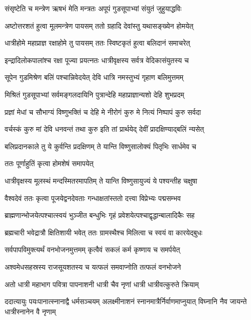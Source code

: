 \twolineshloka
{संसृष्टेति च मन्त्रेण ऋषभं मेति मन्त्रतः}
{अपूपं गुडसूपाभ्यां संयुतं जुहुयाद्धविः} %

\twolineshloka
{अष्टोत्तरशतं हुत्वा मूलमन्त्रेण पायसम्}
{ततो ग्रहादि देवांस्तु यथासङ्ख्येन होमयेत्} %

\twolineshloka
{धात्रीहोमे महाप्राज्ञ रक्षाहोमे तु पायसम्}
{ततः स्विष्टकृतं हुत्वा बलिदानं समाचरेत्} %

\twolineshloka
{इन्द्रादिलोकपालांश्च रक्षा पूज्या प्रयत्नतः}
{धात्रीवृक्षस्य सर्वत्र वेदिकासंयुतस्य च} %

\twolineshloka
{सूपेन गुडमिश्रेण बलिं पश्चान्निवेदयेत्}
{देवि धात्रि नमस्तुभ्यं गृहाण बलिमुत्तमम्} %

\twolineshloka
{मिश्रितं गुडसूपाभ्यां सर्वमङ्गलदायिनि}
{पुत्रान्देहि महाप्राज्ञान्यशो देहि शुभप्रदम्} %

\twolineshloka
{प्रज्ञां मेधां च सौभाग्यं विष्णुभक्तिं च देहि मे}
{नीरोगं कुरु मे नित्यं निष्पापं कुरु सर्वदा} %

\twolineshloka
{वर्चस्कं कुरु मां देवि धनवन्तं तथा कुरु}
{इति तां प्रार्थयेद् देवीं प्रादक्षिण्याद्बलिं न्यसेत्} %

\twolineshloka
{बलिप्रदानकाले तु ये कुर्वन्ति प्रदक्षिणम्}
{ते यान्ति विष्णुसालोक्यं पितृभिः सार्धमेव च} %


\onelineshloka
{ततः पूर्णाहुतिं कृत्वा होमशेषं समापयेत्} %

\twolineshloka
{धात्रीवृक्षस्य मूलस्थं मन्दस्मितरमापतिम्}
{ते यान्ति विष्णुसायुज्यं ये पश्यन्तीह चक्षुषा} %

\twolineshloka
{वैश्वदेवं ततः कृत्वा पूजयेद्वनदेवताः}
{गन्धाक्षतांस्ततो दत्त्वा विप्रेभ्यः पद्मसम्भव} %

\twolineshloka
{ब्राह्मणान्भोजयेत्पश्चात्स्वयं भुञ्जीत बन्धुभिः}
{गृहं प्रवेशयेत्पश्चाद्वृद्धान्बालादिकैः सह} %

\twolineshloka
{ब्रह्मचारी भवेद्रात्रौ क्षितिशायी भवेत् ततः}
{ग्रामस्थैश्च मिलित्वा च स्वयं वा कारयेद्बुधः} %

\twolineshloka
{सर्वपापविमुक्त्यर्थं वनभोजनमुत्तमम्}
{कृत्वैवं सकलं कर्म कृष्णाय च समर्पयेत्} %

\twolineshloka
{अश्वमेधसहस्रस्य राजसूयशतस्य च}
{यत्फलं समवाप्नोति तत्फलं वनभोजने} %

\twolineshloka
{अतो धात्री महाभाग पवित्रा पापनाशनी}
{धात्री चैव नृणां धात्री धात्रीवत्कुरुते क्रियाम्} %

\threelineshloka
{ददात्यायुः पयःपानात्स्नानाद्वै धर्मसञ्चयम्}
{अलक्ष्मीनाशनं स्नानमात्रैर्निर्वाणमाप्नुयात्}
{विघ्नानि नैव जायन्ते धात्रीस्नानेन वै नृणाम्} %

